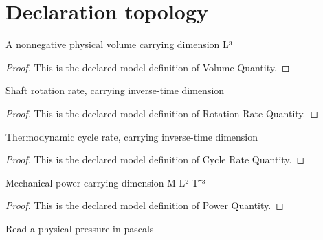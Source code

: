 \section{Declaration topology}
\begin{definition}
  \label{def:physics:phyx-mini-0479:phyxminiproblems-problemphyxmini0479-volumequantity}
  A nonnegative physical volume carrying dimension L³
\end{definition}
\begin{proof}
  This is the declared model definition of Volume Quantity.
\end{proof}
\begin{definition}
  \label{def:physics:phyx-mini-0479:phyxminiproblems-problemphyxmini0479-rotationratequantity}
  Shaft rotation rate, carrying inverse-time dimension
\end{definition}
\begin{proof}
  This is the declared model definition of Rotation Rate Quantity.
\end{proof}
\begin{definition}
  \label{def:physics:phyx-mini-0479:phyxminiproblems-problemphyxmini0479-cycleratequantity}
  Thermodynamic cycle rate, carrying inverse-time dimension
\end{definition}
\begin{proof}
  This is the declared model definition of Cycle Rate Quantity.
\end{proof}
\begin{definition}
  \label{def:physics:phyx-mini-0479:phyxminiproblems-problemphyxmini0479-powerquantity}
  Mechanical power carrying dimension M L² T⁻³
\end{definition}
\begin{proof}
  This is the declared model definition of Power Quantity.
\end{proof}
\begin{definition}
  \label{def:physics:phyx-mini-0479:phyxminiproblems-problemphyxmini0479-pressureinpascals}
  Read a physical pressure in pascals
\end{definition}

